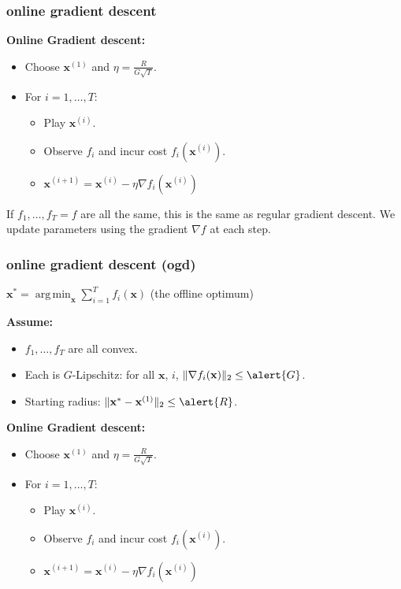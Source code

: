 \documentclass[compress]{beamer}
\newcommand{\bv}[1]{\mathbf{#1}}
\DeclareMathOperator*{\argmin}{arg\,min}
\begin{document}
\begin{frame}[t]
	\frametitle{online gradient descent}
	\textbf{Online Gradient descent:}
\begin{itemize}
	\item Choose $\bv{x}^{(1)}$ and $\eta = \frac{R}{G\sqrt{T}}$. 
	\item For $i = 1,\ldots, T$:
	\begin{itemize}
		\item Play $\bv{x}^{(i)}$.
		\item Observe $f_{i}$ and incur cost $f_{i}(\bv{x}^{(i)})$. 
		\item $\bv{x}^{(i+1)} = \bv{x}^{(i)} - \eta \nabla f_i(\bv{x}^{(i)})$
	\end{itemize}
\end{itemize}
If $f_1, \ldots, f_T = f$ are all the same, this is the same as regular gradient descent. We update parameters using the gradient $\nabla f$ at each step. 
\end{frame}

\begin{frame}[t]
	\frametitle{online gradient descent (ogd)}
	$\bv{x}^{*} = \argmin_\bv{x}\sum_{i=1}^T f_i(\bv{x})$ (the offline optimum)
	
	\textbf{Assume:}
	\begin{itemize}
		\item $f_1, \ldots, f_T$ are all convex.
		\item Each is $G$-Lipschitz: for all $\bv{x}$, $i$, $\|\nabla f_i(\bv{x})\|_2 \leq \alert{G}$.
		\item Starting radius: $\|\bv{x}^{*} - \bv{x}^{(1)}\|_2 \leq \alert{R}$.
	\end{itemize}
	
	\textbf{Online Gradient descent:}
	\begin{itemize}
	\item Choose $\bv{x}^{(1)}$ and $\eta = \frac{R}{G\sqrt{T}}$. 
	\item For $i = 1,\ldots, T$:
	\begin{itemize}
		\item Play $\bv{x}^{(i)}$.
		\item Observe $f_{i}$ and incur cost $f_{i}(\bv{x}^{(i)})$. 
		\item $\bv{x}^{(i+1)} = \bv{x}^{(i)} - \eta \nabla f_i(\bv{x}^{(i)})$
	\end{itemize}
\end{itemize}
\end{frame}
\end{document}
